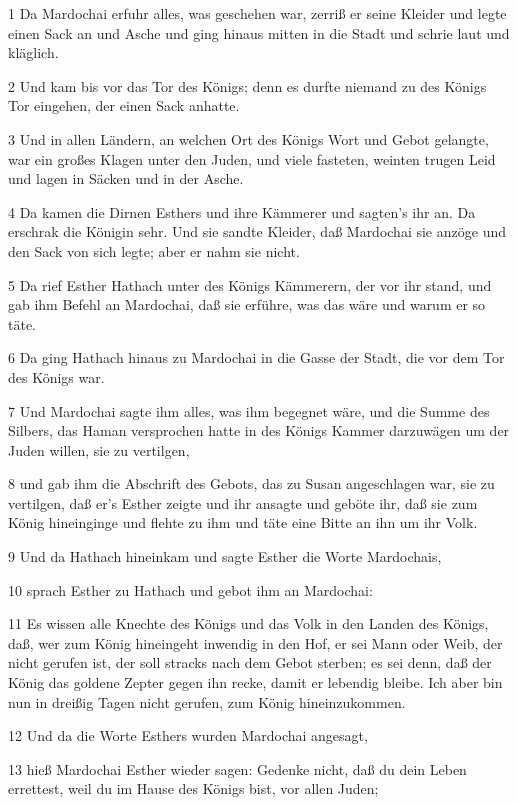 \par 1 Da Mardochai erfuhr alles, was geschehen war, zerriß er seine Kleider und legte einen Sack an und Asche und ging hinaus mitten in die Stadt und schrie laut und kläglich.
\par 2 Und kam bis vor das Tor des Königs; denn es durfte niemand zu des Königs Tor eingehen, der einen Sack anhatte.
\par 3 Und in allen Ländern, an welchen Ort des Königs Wort und Gebot gelangte, war ein großes Klagen unter den Juden, und viele fasteten, weinten trugen Leid und lagen in Säcken und in der Asche.
\par 4 Da kamen die Dirnen Esthers und ihre Kämmerer und sagten's ihr an. Da erschrak die Königin sehr. Und sie sandte Kleider, daß Mardochai sie anzöge und den Sack von sich legte; aber er nahm sie nicht.
\par 5 Da rief Esther Hathach unter des Königs Kämmerern, der vor ihr stand, und gab ihm Befehl an Mardochai, daß sie erführe, was das wäre und warum er so täte.
\par 6 Da ging Hathach hinaus zu Mardochai in die Gasse der Stadt, die vor dem Tor des Königs war.
\par 7 Und Mardochai sagte ihm alles, was ihm begegnet wäre, und die Summe des Silbers, das Haman versprochen hatte in des Königs Kammer darzuwägen um der Juden willen, sie zu vertilgen,
\par 8 und gab ihm die Abschrift des Gebots, das zu Susan angeschlagen war, sie zu vertilgen, daß er's Esther zeigte und ihr ansagte und geböte ihr, daß sie zum König hineinginge und flehte zu ihm und täte eine Bitte an ihn um ihr Volk.
\par 9 Und da Hathach hineinkam und sagte Esther die Worte Mardochais,
\par 10 sprach Esther zu Hathach und gebot ihm an Mardochai:
\par 11 Es wissen alle Knechte des Königs und das Volk in den Landen des Königs, daß, wer zum König hineingeht inwendig in den Hof, er sei Mann oder Weib, der nicht gerufen ist, der soll stracks nach dem Gebot sterben; es sei denn, daß der König das goldene Zepter gegen ihn recke, damit er lebendig bleibe. Ich aber bin nun in dreißig Tagen nicht gerufen, zum König hineinzukommen.
\par 12 Und da die Worte Esthers wurden Mardochai angesagt,
\par 13 hieß Mardochai Esther wieder sagen: Gedenke nicht, daß du dein Leben errettest, weil du im Hause des Königs bist, vor allen Juden;
